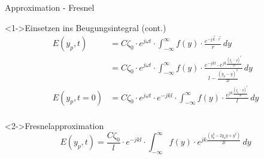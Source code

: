 \begin{frame}{Approximation - Fresnel}
    \begin{block}<1->{Einsetzen ins Beugungsintegral (cont.)}
        \begin{align*}
            E(y_p, t)
            &=
            C\zeta_0 \cdot e^{j\omega t} \cdot \int_{-\infty}^{\infty}f(y)\cdot\frac{e^{-j\vec{k}\cdot\vec{r}}}{r} \,dy \\
            &=
            C\zeta_0 \cdot e^{j\omega t} \cdot \int_{-\infty}^{\infty}f(y)\cdot\frac{e^{-jkl} \cdot e^{jk\frac{(y_p-y)^2}{2l}}}{l - \frac{(y_p-y)^2}{2l}} \,dy \\
            E(y_p, t = 0)
            &=
            C\zeta_0 \cdot e^{j\omega t} \cdot e^{-jkl} \cdot \int_{-\infty}^{\infty}f(y)\cdot\frac{e^{jk\frac{(y_p-y)^2}{2l}}}{l} \,dy \\
        \end{align*}
    \end{block}
    \begin{exampleblock}<2->{Fresnelapproximation}
        \begin{equation*}
            E(y_p, t)
            =
            \frac{C\zeta_0}{l} \cdot e^{-jkl} \cdot \int_{-\infty}^{\infty}f(y)\cdot e^{jk\frac{(y_p^2 - 2y_py + y^2)}{2l}} \,dy
        \end{equation*}
    \end{exampleblock}
\end{frame}


